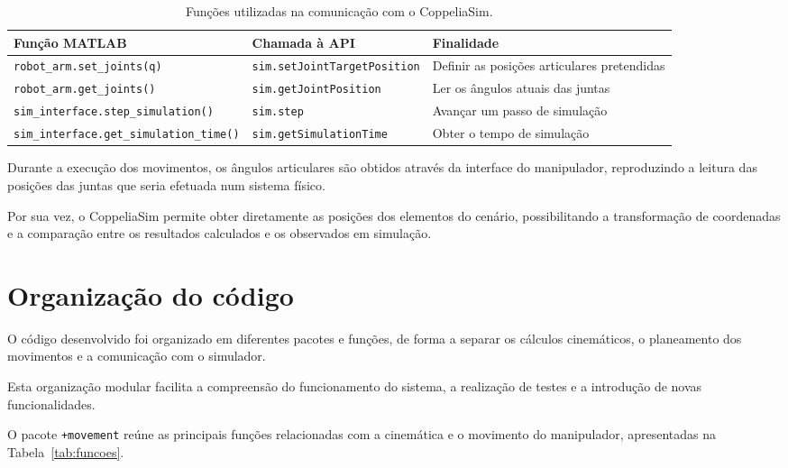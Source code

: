 \begin{table}[H]
    \centering
    \caption{Funções utilizadas na comunicação com o CoppeliaSim.}
    \label{tab:api}
    \small
    \begin{tabular}{p{4.4cm}p{4.0cm}p{3.6cm}}
        \hline
        Função MATLAB & Chamada à API & Finalidade \\[2pt]
        \hline
        \texttt{robot\_arm.set\_joints(q)}
        & \texttt{sim.setJoint}\allowbreak\texttt{TargetPosition}
        & Definir as posições articulares pretendidas \\

        \texttt{robot\_arm.get\_joints()}
        & \texttt{sim.getJointPosition}
        & Ler os ângulos atuais das juntas \\

        \texttt{sim\_interface.}\allowbreak\texttt{step\_simulation()}
        & \texttt{sim.step}
        & Avançar um passo de simulação \\

        \texttt{sim\_interface.}\allowbreak\texttt{get\_simulation\_time()}
        & \texttt{sim.getSimulationTime}
        & Obter o tempo de simulação \\
        \hline
    \end{tabular}
\end{table}

Durante a execução dos movimentos, os ângulos articulares são obtidos através da interface do manipulador, reproduzindo a leitura das posições das juntas que seria efetuada num sistema físico.

Por sua vez, o CoppeliaSim permite obter diretamente as posições dos elementos do cenário, possibilitando a transformação de coordenadas e a comparação entre os resultados calculados e os observados em simulação.

\section{Organização do código}
\label{sec:organizacao}

O código desenvolvido foi organizado em diferentes pacotes e funções, de forma a separar os cálculos cinemáticos, o planeamento dos movimentos e a comunicação com o simulador.

Esta organização modular facilita a compreensão do funcionamento do sistema, a realização de testes e a introdução de novas funcionalidades.

O pacote \texttt{+movement} reúne as principais funções relacionadas com a cinemática e o movimento do manipulador, apresentadas na Tabela~\ref{tab:funcoes}.

